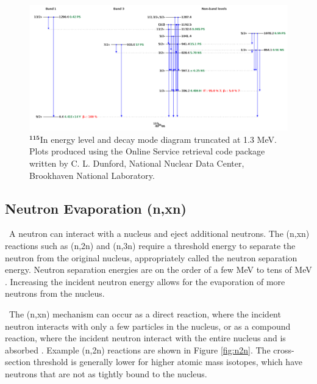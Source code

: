 \begin{figure}[ht]
	\includegraphics[width=\linewidth]{Figures/Chapter2/TruncatedIn115.png}
	\caption[$\mathrm{^{115}}$In energy level and decay mode diagram truncated at 1.3 MeV.]{$\mathbf{^{115}}$In energy level and decay mode diagram truncated at 1.3 MeV. Plots produced using the Online Service retrieval code package written by C. L. Dunford, National Nuclear Data Center, Brookhaven National Laboratory.}
	\label{fig:In115Rxn}
\end{figure}

\subsection{Neutron Evaporation (n,xn)}

\ A neutron can interact with a nucleus and eject additional neutrons. 
The (n,xn) reactions such as (n,2n) and (n,3n) require a threshold energy to separate the neutron from the original nucleus, appropriately called the neutron separation energy. 
Neutron separation energies are on the order of a few MeV to tens of MeV \cite{Krane,n2ns}. 
Increasing the incident neutron energy allows for the evaporation of more neutrons from the nucleus. 

\ The (n,xn) mechanism can occur as a direct reaction, where the incident neutron interacts with only a few particles in the nucleus, or as a compound reaction, where the incident neutron interact with the entire nucleus and is absorbed \cite{Turner}. 
Example (n,2n) reactions are shown in Figure \ref{fig:n2n}. 
The cross-section threshold is generally lower for higher atomic mass isotopes, which have neutrons that are not as tightly bound to the nucleus. 

